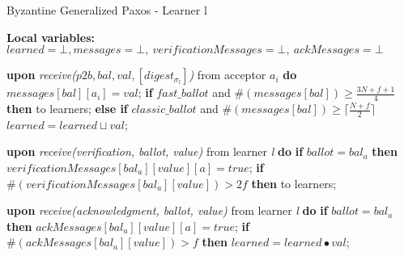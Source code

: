\begin{algorithm}
	\caption{Byzantine Generalized Paxos - Learner l}
	\textbf{Local variables: } $learned = \bot, messages = \bot,\ verificationMessages = \bot,\ ackMessages = \bot$ 
	\begin{algorithmic}[1]
		\State \textbf{upon} \textit{receive($p2b, bal, val, [digest_{\sigma_l}]$)} from acceptor $a_i$ \textbf{do}
		\State \hspace{\algorithmicindent} $messages[bal][a_i] = val$;
		\State \hspace{\algorithmicindent} \textbf{if} $fast\_ballot$ and $\#(messages[bal]) \geq \frac{3N+f+1}{4}$ \textbf{then}
		\State\hspace{\algorithmicindent}\hspace{\algorithmicindent}  to learners;
		\State \hspace{\algorithmicindent} \textbf{else if} $classic\_ballot$ and $\#(messages[bal]) \geq \lceil \frac{N+f}{2}\rceil$
		\State \hspace{\algorithmicindent} \hspace{\algorithmicindent} $learned = learned \sqcup val$;
		
		\State 
		\State \textbf{upon} \textit{receive(verification, ballot, value)} from learner \textit{l} \textbf{do}
		\State \hspace{\algorithmicindent}\textbf{if} $ballot = bal_a$ \textbf{then}
		\State \hspace{\algorithmicindent}\hspace{\algorithmicindent} $verificationMessages[bal_a][value][a] = true$;
		\State \hspace{\algorithmicindent}\hspace{\algorithmicindent} \textbf{if} $\#(verificationMessages[bal_a][value]) > 2f$ \textbf{then}
		\State \hspace{\algorithmicindent}\hspace{\algorithmicindent} \hspace{\algorithmicindent}  to learners;
		
		\State 
		\State \textbf{upon} \textit{receive(acknowledgment, ballot, value)} from learner \textit{l} \textbf{do}
		\State \hspace{\algorithmicindent}\textbf{if} $ballot = bal_a$ \textbf{then}
		\State \hspace{\algorithmicindent}\hspace{\algorithmicindent} $ackMessages[bal_a][value][a] = true$;
		\State \hspace{\algorithmicindent}\hspace{\algorithmicindent} \textbf{if} $\#(ackMessages[bal_a][value]) > f$ \textbf{then}
		\State \hspace{\algorithmicindent}\hspace{\algorithmicindent} \hspace{\algorithmicindent} $learned = learned \bullet val$;
		
	\end{algorithmic}
\end{algorithm}
